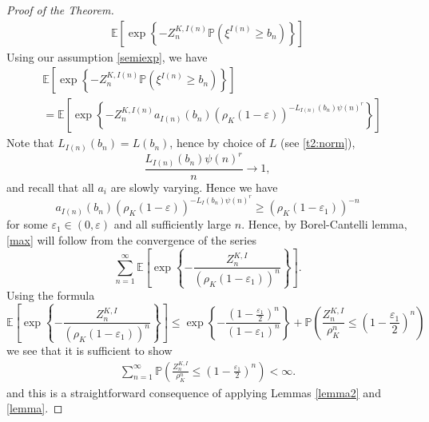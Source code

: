 \documentclass[12pt]{article}
\numberwithin{equation}{section}
\begin{document}
\begin{proof} [Proof of the Theorem]
\begin{align*}
        \mathbb{E} \left[ \exp \left\{ -{Z^{K,I(n)}_n} \mathbb{P} \left( \xi^{I(n)} \geq b_n  \right) \right\} \right]
    \end{align*}
    Using our assumption \ref{semiexp}, we have
    \begin{align*}
        &\mathbb{E} \left[ \exp \left\{ -{Z^{K,I(n)}_n} \mathbb{P} \left( \xi^{I(n)} \geq b_n  \right) \right\} \right] \\&=
        \mathbb{E} \left[ \exp \left\{ -{Z^{K,I(n)}_n} a_{I(n)}\left(  b_n \right)  \left(\rho_K(1-\varepsilon)\right)^{- L_{I(n)}\left( b_n \right) \psi(n)^r} \right\} \right]
    \end{align*}
    Note that $L_{I(n)}\left( b_n \right) = L\left( b_n \right)$, hence by choice of $L$ (see \eqref{t2:norm}), 
    \[\frac{L_{I(n)}\left( b_n \right) \psi(n)^r} n \rightarrow 1, \]and recall that all $a_i$ are slowly varying. Hence we have 
    \[
    a_{I(n)}\left(  b_n \right)  \left(\rho_K(1-\varepsilon)\right)^{- L_I\left( b_n \right) \psi(n)^r} \geq \left(\rho_K(1-\varepsilon_1)\right)^{-n}
    \]
    for some $\varepsilon_1 \in (0,\varepsilon)$ and all sufficiently large $n$.
    Hence, by Borel-Cantelli lemma, \eqref{max} will follow from the convergence of the series 
    \[
    \sum_{n=1}^\infty \mathbb{E} \left[ \exp \left\{ -\frac {Z^{K,I}_n} {\left(\rho_K(1-\varepsilon_1)\right)^n} \right\}\right].
    \]
     Using the formula 
    \[
     \mathbb{E} \left[ \exp \left\{ -\frac {Z^{K,I}_n} {\left(\rho_K(1-\varepsilon_1)\right)^n} \right\}\right] \leq  \exp \left\{ -\frac {\left(1-\frac {\varepsilon_1} 2\right)^n} {\left(1-\varepsilon_1\right)^n} \right\} + \mathbb{P}\left(\frac {Z^{K,I}_n} {\rho_K^n} \leq \left(1-\frac {\varepsilon_1} 2\right)^n \right)
    \]
    we see that it is sufficient to show 
    \begin{align*}\label{sum}
        \sum_{n=1}^\infty \mathbb{P}\left(\frac {Z^{K,I}_n} {\rho_K^n} \leq \left(1-\frac {\varepsilon_1} 2\right)^n \right) < \infty.
    \end{align*}
    and this is a straightforward consequence of applying Lemmas \ref{lemma2} and \ref{lemma}.
\end{proof}
\end{document}
